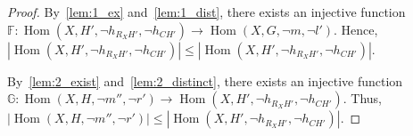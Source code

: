\begin{proof}
    By~\autoref{lem:1_ex} and~\autoref{lem:1_dist}, there exists an injective function $\mathbb{F} : \operatorname{Hom}(X, H', \lnot h_{R_XH'}, \lnot h_{CH'}) \mathop{\to} \operatorname{Hom}(X, G, \lnot m, \lnot l')$. Hence, $|\operatorname{Hom}(X, H', \lnot h_{R_XH'}, \lnot h_{CH'})| \leq |\operatorname{Hom}(X, H', \lnot h_{R_XH'}, \lnot h_{CH'})|$.
   
    By~\autoref{lem:2_exist} and~\autoref{lem:2_distinct}, there exists an injective function $\mathbb{G} : \operatorname{Hom}(X, H, \lnot m'', \lnot r') \mathop{\to} \operatorname{Hom}(X, H', \lnot h_{R_XH'}, \lnot h_{CH'})$. Thus, $|\operatorname{Hom}(X, H, \lnot m'', \lnot r')| \leq |\operatorname{Hom}(X, H', \lnot h_{R_XH'}, \lnot h_{CH'})|$.

\end{proof}  








          

